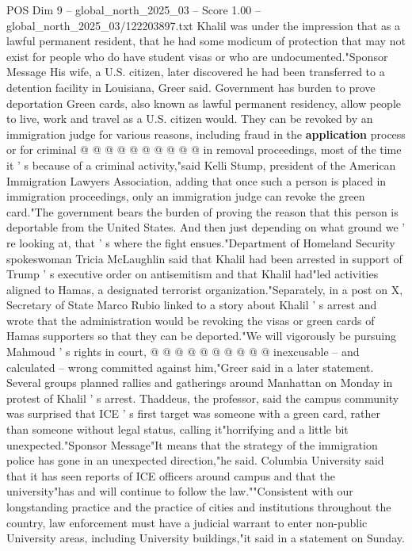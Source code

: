\begin{textsample}{POS Dim 9 – global\_north\_2025\_03 – Score 1.00 – global\_north\_2025\_03/122203897.txt}
Khalil was under the impression that as a lawful permanent resident, that he had some modicum of protection that may not exist for people who do have student visas or who are undocumented."Sponsor Message His wife, a U.S. citizen, later discovered he had been transferred to a detention facility in Louisiana, Greer said.
Government has burden to prove deportation Green cards, also known as lawful permanent residency, allow people to live, work and travel as a U.S. citizen would.
They can be revoked by an immigration judge for various reasons, including fraud in the \textbf{application} process or for criminal @ @ @ @ @ @ @ @ @ @ in removal proceedings, most of the time it ' s because of a criminal activity,"said Kelli Stump, president of the American Immigration Lawyers Association, adding that once such a person is placed in immigration proceedings, only an immigration judge can revoke the green card."The government bears the burden of proving the reason that this person is deportable from the United States.
And then just depending on what ground we ' re looking at, that ' s where the fight ensues."Department of Homeland Security spokeswoman Tricia McLaughlin said that Khalil had been arrested in support of Trump ' s executive order on antisemitism and that Khalil had"led activities aligned to Hamas, a designated terrorist organization."Separately, in a post on X, Secretary of State Marco Rubio linked to a story about Khalil ' s arrest and wrote that the administration would be revoking the visas or green cards of Hamas supporters so that they can be deported."We will vigorously be pursuing Mahmoud ' s rights in court, @ @ @ @ @ @ @ @ @ @ inexcusable -- and calculated -- wrong committed against him,"Greer said in a later statement.
Several groups planned rallies and gatherings around Manhattan on Monday in protest of Khalil ' s arrest.
Thaddeus, the professor, said the campus community was surprised that ICE ' s first target was someone with a green card, rather than someone without legal status, calling it"horrifying and a little bit unexpected."Sponsor Message"It means that the strategy of the immigration police has gone in an unexpected direction,"he said.
Columbia University said that it has seen reports of ICE officers around campus and that the university"has and will continue to follow the law.""Consistent with our longstanding practice and the practice of cities and institutions throughout the country, law enforcement must have a judicial warrant to enter non-public University areas, including University buildings,"it said in a statement on Sunday.

\end{textsample}
